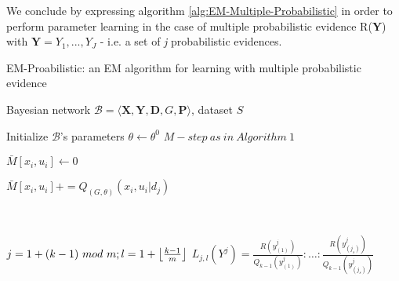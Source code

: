 \documentclass[11pt]{article}
\begin{document}
\begin{article}
We conclude by expressing algorithm
\ref{alg:EM-Multiple-Probabilistic} in order to perform
parameter learning in the case of multiple probabilistic evidence
R(\textbf{Y}) with \(\textbf{Y} = {Y_1, ..., Y_J}\) - i.e. a set of \emph{j}
probabilistic evidences.

\algrenewcommand\algorithmicindent{1.5em}%

\begin{algorithm*}[h!]
\caption{EM-Proabilistic: an EM algorithm for learning with multiple probabilistic evidence}
\label{alg:EM-Multiple-Probabilistic}
\vspace{-10pt}
\begin{multicols}{2}
\begin{algorithmic}[1] 
\Require Bayesian network $\mathcal{B}=\langle \mathbf{X}, \mathbf{Y},\mathbf{D}, G, \mathbf{P} \rangle$, dataset $S$ 

\State Initialize $\mathcal{B}$'s parameters $\theta \leftarrow \theta^0$
  \State $M-step \ as \ in \ Algorithm \ 1$
\EndFor
\\
 

   \State $\bar{M}[x_{i},u_{i}]\leftarrow 0$
  \EndFor
\EndFor

     

        \State $\bar{M}[x_{i},u_{i}] \mathrel{{+}{=}} Q_{(G,\theta)}(x_{i},u_{i}|d_{j})$ 
      \EndFor
    \EndFor
\EndFor
\EndFunction
\\

\\

  \State $j = 1 + (k-1) \ mod \ m; l = 1 + \floor*{\frac{k-1}{m}}$
  \State $L_{j,l}(Y^j) = \frac{R(y^j_{(1)})}{Q_{k-1}(y^j_{(1)})} : \ldots : \frac{R(y^j_{(j_s)})}{Q_{k-1}(y^j_{(j_s)})}$ 
\\
\\
\end{algorithmic}
\end{multicols}
\end{algorithm*}
\end{article}
\end{document}
